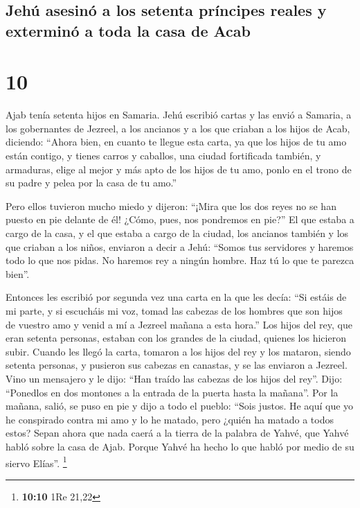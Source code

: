 \hypertarget{jehuxfa-asesinuxf3-a-los-setenta-pruxedncipes-reales-y-exterminuxf3-a-toda-la-casa-de-acab}{%
\subsection{Jehú asesinó a los setenta príncipes reales y exterminó a
toda la casa de
Acab}\label{jehuxfa-asesinuxf3-a-los-setenta-pruxedncipes-reales-y-exterminuxf3-a-toda-la-casa-de-acab}}

\hypertarget{section-9}{%
\section{10}\label{section-9}}

 Ajab tenía setenta hijos en Samaria. Jehú escribió cartas
y las envió a Samaria, a los gobernantes de Jezreel, a los ancianos y a
los que criaban a los hijos de Acab, diciendo:  ``Ahora
bien, en cuanto te llegue esta carta, ya que los hijos de tu amo están
contigo, y tienes carros y caballos, una ciudad fortificada también, y
armaduras,  elige al mejor y más apto de los hijos de tu
amo, ponlo en el trono de su padre y pelea por la casa de tu amo.''

 Pero ellos tuvieron mucho miedo y dijeron: ``¡Mira que
los dos reyes no se han puesto en pie delante de él! ¿Cómo, pues, nos
pondremos en pie?''  El que estaba a cargo de la casa, y
el que estaba a cargo de la ciudad, los ancianos también y los que
criaban a los niños, enviaron a decir a Jehú: ``Somos tus servidores y
haremos todo lo que nos pidas. No haremos rey a ningún hombre. Haz tú lo
que te parezca bien''.

 Entonces les escribió por segunda vez una carta en la que
les decía: ``Si estáis de mi parte, y si escucháis mi voz, tomad las
cabezas de los hombres que son hijos de vuestro amo y venid a mí a
Jezreel mañana a esta hora.'' Los hijos del rey, que eran setenta
personas, estaban con los grandes de la ciudad, quienes los hicieron
subir.  Cuando les llegó la carta, tomaron a los hijos del
rey y los mataron, siendo setenta personas, y pusieron sus cabezas en
canastas, y se las enviaron a Jezreel.  Vino un mensajero
y le dijo: ``Han traído las cabezas de los hijos del rey''. Dijo:
``Ponedlos en dos montones a la entrada de la puerta hasta la mañana''.
 Por la mañana, salió, se puso en pie y dijo a todo el
pueblo: ``Sois justos. He aquí que yo he conspirado contra mi amo y lo
he matado, pero ¿quién ha matado a todos estos?  Sepan
ahora que nada caerá a la tierra de la palabra de Yahvé, que Yahvé habló
sobre la casa de Ajab. Porque Yahvé ha hecho lo que habló por medio de
su siervo Elías''. \footnote{\textbf{10:10} 1Re 21,22}

